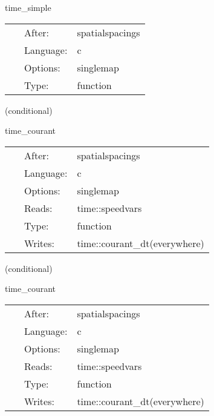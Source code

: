 \documentclass{article}
\begin{document}
\hspace{5mm} time\_simple 

\hspace{5mm}{\it set timestep based on courant condition (courant\_static) } 


\hspace{5mm}

 \begin{tabular*}{160mm}{cll} 
~ & After:  & spatialspacings \\ 
~ & Language:  & c \\ 
~ & Options:  & singlemap \\ 
~ & Type:  & function \\ 
\end{tabular*} 


\vspace{5mm}

   (conditional) 

\hspace{5mm} time\_courant 

\hspace{5mm}{\it set timestep based on courant condition (courant\_speed) } 


\hspace{5mm}

 \begin{tabular*}{160mm}{cll} 
~ & After:  & spatialspacings \\ 
~ & Language:  & c \\ 
~ & Options:  & singlemap \\ 
~ & Reads:  & time::speedvars \\ 
~ & Type:  & function \\ 
~ & Writes:  & time::courant\_dt(everywhere) \\ 
\end{tabular*} 


\vspace{5mm}

   (conditional) 

\hspace{5mm} time\_courant 

\hspace{5mm}{\it reset timestep each iteration } 


\hspace{5mm}

 \begin{tabular*}{160mm}{cll} 
~ & After:  & spatialspacings \\ 
~ & Language:  & c \\ 
~ & Options:  & singlemap \\ 
~ & Reads:  & time::speedvars \\ 
~ & Type:  & function \\ 
~ & Writes:  & time::courant\_dt(everywhere) \\ 
\end{tabular*} 
\end{document}
